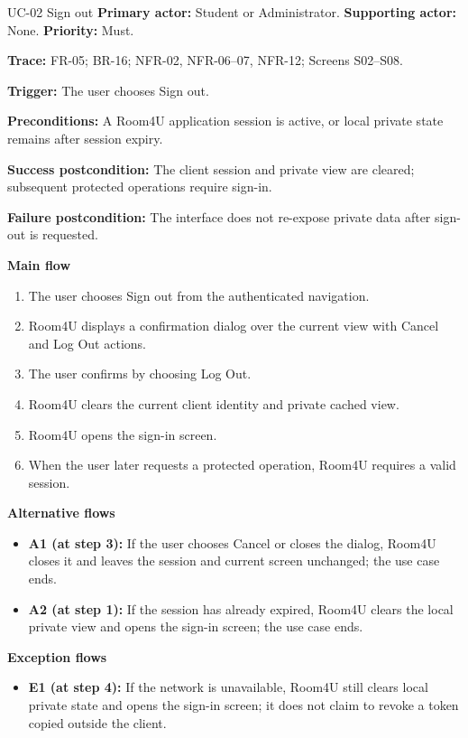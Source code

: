 \begin{usecasebox}{UC-02 Sign out}
\noindent\textbf{Primary actor:} Student or Administrator.\quad
\textbf{Supporting actor:} None.\quad
\textbf{Priority:} Must.\par
\textbf{Trace:} FR-05; BR-16; NFR-02, NFR-06--07, NFR-12; Screens S02--S08.\par
\textbf{Trigger:} The user chooses Sign out.\par
\textbf{Preconditions:} A Room4U application session is active, or local private state remains after session expiry.\par
\textbf{Success postcondition:} The client session and private view are cleared; subsequent protected operations require sign-in.\par
\textbf{Failure postcondition:} The interface does not re-expose private data after sign-out is requested.\par
\textbf{Main flow}
\begin{enumerate}[label=\arabic*.,leftmargin=2em,itemsep=1pt,topsep=2pt]
  \item The user chooses Sign out from the authenticated navigation.
  \item Room4U displays a confirmation dialog over the current view with Cancel and Log Out actions.
  \item The user confirms by choosing Log Out.
  \item Room4U clears the current client identity and private cached view.
  \item Room4U opens the sign-in screen.
  \item When the user later requests a protected operation, Room4U requires a valid session.
\end{enumerate}
\textbf{Alternative flows}
\begin{itemize}[label={},leftmargin=0pt,itemsep=1pt,topsep=1pt]
  \item \textbf{A1 (at step 3):} If the user chooses Cancel or closes the dialog, Room4U closes it and leaves the session and current screen unchanged; the use case ends.
  \item \textbf{A2 (at step 1):} If the session has already expired, Room4U clears the local private view and opens the sign-in screen; the use case ends.
\end{itemize}
\textbf{Exception flows}
\begin{itemize}[label={},leftmargin=0pt,itemsep=1pt,topsep=1pt]
  \item \textbf{E1 (at step 4):} If the network is unavailable, Room4U still clears local private state and opens the sign-in screen; it does not claim to revoke a token copied outside the client.
\end{itemize}
\end{usecasebox}


